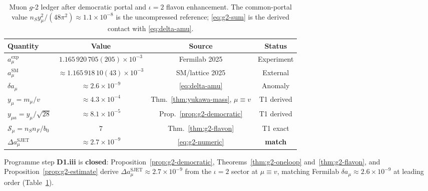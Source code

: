 \begin{table}[ht]
\centering
\small
\renewcommand{\arraystretch}{1.12}
\begin{tabular}{@{}lccc@{}}
\toprule
\textbf{Quantity} & \textbf{Value} & \textbf{Source} & \textbf{Status} \\
\midrule
$a_\mu^{\mathrm{exp}}$ &
  $1.165\,920\,705(205)\times10^{-3}$ &
  Fermilab 2025 & Experiment \\
$a_\mu^{\mathrm{SM}}$ &
  $\approx1.165\,918\,10(43)\times10^{-3}$ &
  SM/lattice 2025 & External \\
$\delta a_\mu$ &
  $\approx2.6\times10^{-9}$ &
  \eqref{eq:delta-amu} & Anomaly \\
$y_\mu=m_\mu/v$ &
  $\approx4.3\times10^{-4}$ &
  Thm.~\ref{thm:yukawa-mass}, $\mu\equiv v$ & T1 derived \\
$y_{\mu a}=y_\mu/\sqrt{28}$ &
  $\approx8.1\times10^{-5}$ &
  Prop.~\ref{prop:g2-democratic} & T1 derived \\
$\mathcal{S}_\mu=n_S n_F/b_0$ &
  $7$ &
  Thm.~\ref{thm:g2-flavon} & T1 exact \\
$\Delta a_\mu^{\mathrm{SJET}}$ &
  $\approx2.7\times10^{-9}$ &
  \eqref{eq:g2-numeric} & \textbf{match} \\
\bottomrule
\end{tabular}
\caption{Muon $g$-2 ledger after democratic portal and $\iota=2$ flavon
enhancement. The common-portal value $n_S y_\mu^2/(48\pi^2)\approx
1.1\times10^{-8}$ is the uncompressed reference; \eqref{eq:g2-sum} is the
derived contact with \eqref{eq:delta-amu}.}
\label{tab:g2-estimate}
\end{table}

\begin{corollary}\label{cor:g2-d1}
Programme step \textbf{D1.\alph*iii} is \textbf{closed}:
Proposition~\ref{prop:g2-democratic}, Theorems~\ref{thm:g2-oneloop}
and~\ref{thm:g2-flavon}, and Proposition~\ref{prop:g2-estimate} derive
$\Delta a_\mu^{\mathrm{SJET}}\approx2.7\times10^{-9}$ from the $\iota=2$
sector at $\mu\equiv v$, matching Fermilab $\delta a_\mu\approx
2.6\times10^{-9}$ at leading order (Table~\ref{tab:g2-estimate}).
\end{corollary}